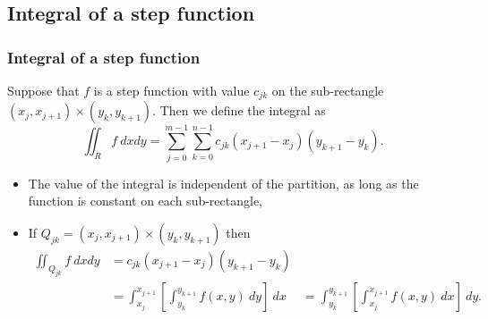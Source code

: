 \documentclass[aspectratio=169,handout]{beamer}
\begin{document}
\begin{frame}
\begin{columns}
\begin{column}{.5\textwidth}
        \end{column}
    \end{columns}

\end{frame}

\subsection{Integral of a step function}

\begin{frame}
    \frametitle{Integral of a step function}

    \begin{definition}
        Suppose that \(f\) is a step function with value \(c_{jk}\) on the sub-rectangle \((x_{j},x_{j+1})\times (y_{k},y_{k+1})\).
        Then we define the integral as
        \[
            \iint_{R} f \ dxdy = \sum_{j=0}^{m-1} \sum_{k=0}^{n-1} c_{jk} (x_{j+1}-x_{j})(y_{k+1}-y_{k}).
        \]
    \end{definition}

    \begin{itemize}
        \item The value of the integral is independent of the partition, as long as the function is constant on each sub-rectangle,
        \item If \(Q_{jk} = (x_{j},x_{j+1})\times (y_{k},y_{k+1})\) then
              \[
                  \begin{aligned}
                      \iint_{Q_{jk}} f \ dxdy & = c_{jk} (x_{j+1}-x_{j})(y_{k+1}-y_{k})                                       \\
                                              & = \int_{x_j}^{x_{j+1}} \left[\int_{y_k}^{y_{k+1}}f(x,y) \ dy\right] \ dx
                                              & =  \int_{y_k}^{y_{k+1}} \left[ \int_{x_j}^{x_{j+1}} f(x,y) \ dx \right] \ dy.
                  \end{aligned}
              \]
    \end{itemize}

\end{frame}
\end{document}
